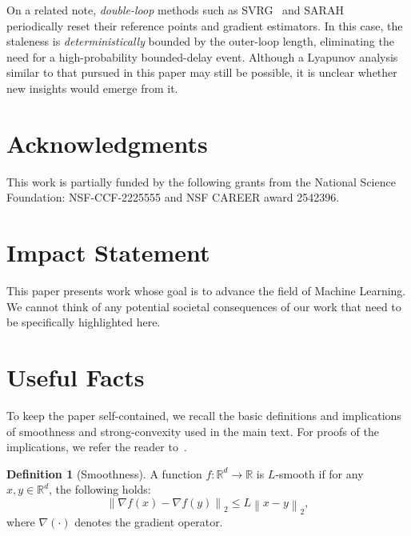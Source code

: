 \documentclass{article}
\theoremstyle{plain}
\theoremstyle{definition}
\newtheorem{definition}[theorem]{Definition}
\newcommand{\R}{\mathbb{R}}
\newcommand{\norm}[1]{\left\| #1\right\|_{2}}
\begin{document}
On a related note, \emph{double-loop} methods such as SVRG~\cite{SVRG} and SARAH~\cite{SARAH} periodically reset their reference points and gradient estimators. In this case, the staleness is \emph{deterministically} bounded by the outer-loop length, eliminating the need for a high-probability bounded-delay event. Although a Lyapunov analysis similar to that pursued in this paper may still be possible, it is unclear whether new insights would emerge from it.

\section*{Acknowledgments}
This work is partially funded by the following grants from the National Science Foundation: NSF-CCF-2225555 and NSF CAREER award 2542396. 


\section*{Impact Statement}
This paper presents work whose goal is to advance the field of Machine
Learning. We cannot think of any potential societal consequences of our work that need to be specifically highlighted here.

\clearpage



\newpage
\appendix
\onecolumn
\section{Useful Facts}
To keep the paper self-contained, we recall the basic definitions and implications of smoothness and strong-convexity used in the main text. For proofs of the implications, we refer the reader to~\citet{bubeck2015convex}. 
\begin{definition}[Smoothness]
A function $f:\R^d\to \R$ is $L$-smooth if for any $x,y\in\R^d$, the following holds:
\begin{equation}
    \norm{\nabla f(x)-\nabla f(y)}\leq L\norm{x-y},
\end{equation}
where $\nabla(\cdot)$ denotes the gradient operator.
\end{definition}
\end{document}
